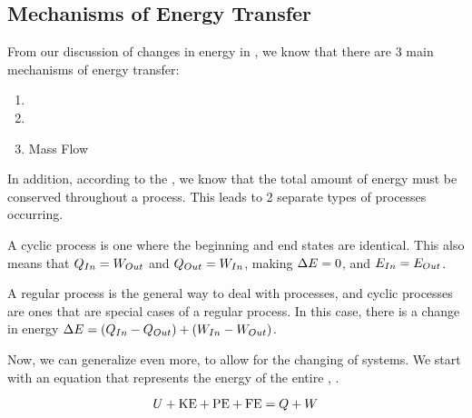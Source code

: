 \subsection{Mechanisms of Energy Transfer}\label{subsec:Mechanisms_Energy_Transfer}
From our discussion of changes in energy in , we know that there are 3 main mechanisms of energy transfer:
\begin{enumerate}[noitemsep]
\item {}
\item {}
\item Mass Flow
\end{enumerate}

In addition, according to the , we know that the total amount of energy must be conserved throughout a process.
This leads to 2 separate types of processes occurring.
\begin{description}[noitemsep]
\item[Cyclical] A cyclic process is one where the beginning and end states are identical.
  This also means that $Q_{In} = W_{Out}$ and $Q_{Out} = W_{In}$, making $\Delta E = 0$, and $E_{In} = E_{Out}$.
\item[Regular] A regular process is the general way to deal with processes, and cyclic processes are ones that are special cases of a regular process.
  In this case, there is a change in energy $\Delta E = (Q_{In} - Q_{Out}) + (W_{In} - W_{Out})$.
\end{description}

Now, we can generalize  even more, to allow for the changing of systems.
We start with an equation that represents the energy of the entire , .

\begin{equation}\label{eq:System_Energy}
  U + \mathrm{KE} + \mathrm{PE} + \mathrm{FE} = Q + W
\end{equation}


